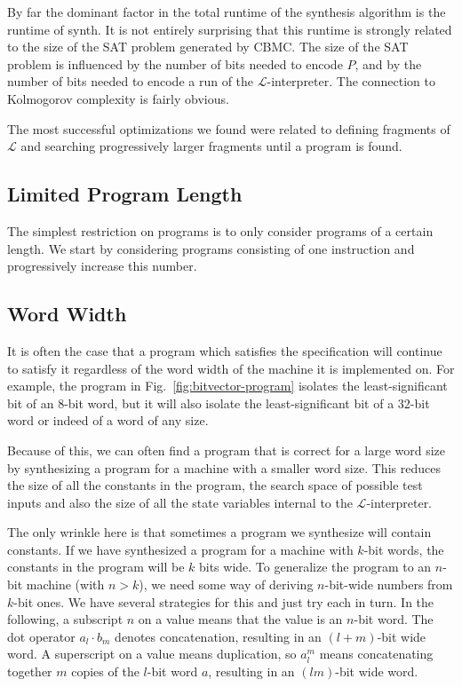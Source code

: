 \documentclass[a4paper]{llncs}
\begin{document}
By far the dominant factor in the total runtime of the synthesis algorithm is
the runtime of {\sc synth}.  It is not entirely surprising that this runtime
is strongly related to the size of the SAT problem generated by CBMC.  The size
of the SAT problem is influenced by the number of bits needed to encode $P$,
and by the number of bits needed to encode a run of the $\mathcal{L}$-interpreter.
The connection to Kolmogorov complexity is fairly obvious.

The most successful optimizations we found were related to defining
fragments of $\mathcal{L}$ and searching progressively larger fragments
until a program is found.

\subsection{Limited Program Length}

The simplest restriction on programs is to only consider programs of a certain length.
We start by considering programs consisting of one instruction and progressively
increase this number.

\subsection{Word Width}

It is often the case that a program which satisfies the specification will
continue to satisfy it regardless of the word width of the machine it is
implemented on.  For example, the program in Fig.~\ref{fig:bitvector-program}
isolates the least-significant bit of an 8-bit word, but it will also
isolate the least-significant bit of a 32-bit word or indeed of a word of
any size.

Because of this, we can often find a program that is correct for a large
word size by synthesizing a program for a machine with a smaller word size.
This reduces the size of all the constants in the program, the search space
of possible test inputs and also the size of all the state variables internal
to the $\mathcal{L}$-interpreter.

The only wrinkle here is that sometimes a program we synthesize will contain
constants.  If we have synthesized a program for a machine with $k$-bit words,
the constants in the program will be $k$ bits wide.  To generalize the program
to an $n$-bit machine (with $n > k$), we need some way of deriving $n$-bit-wide
numbers from $k$-bit ones.  We have several strategies for this and
just try each in turn.  In the following, a subscript $n$ on a value means that
the value is an $n$-bit word.  The dot operator $a_l \cdot b_m$ denotes
concatenation, resulting in an $(l+m)$-bit wide word.  A superscript on a value
means duplication, so $a_l^m$ means concatenating together $m$ copies of the $l$-bit
word $a$, resulting in an $(lm)$-bit wide word.
\end{document}
